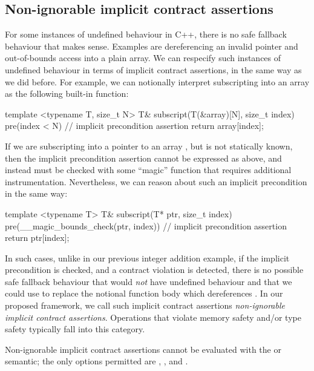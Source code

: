 \subsection{Non-ignorable implicit contract assertions}

For some instances of undefined behaviour in C++, there is no safe fallback behaviour that makes sense. Examples are dereferencing an invalid pointer and out-of-bounds access into a plain array. We can respecify such instances of undefined behaviour in terms of implicit contract assertions, in the same way as we did before. For example, we can notionally interpret subscripting into an array as the following built-in function:
\begin{codeblock}
template <typename T, size_t N>
T& subscript(T(&array)[N], size_t index) 
pre(index < N) {  // implicit precondition assertion
  return array[index];
}
\end{codeblock}
If we are subscripting into a pointer  to an array , but  is not statically known, then the implicit precondition assertion cannot be expressed as above, and instead must be checked with some ``magic'' function that requires additional instrumentation. Nevertheless, we can reason about such an implicit precondition in the same way:
\begin{codeblock}
template <typename T>
T& subscript(T* ptr, size_t index) 
pre(__magic_bounds_check(ptr, index)) {  // implicit precondition assertion
  return ptr[index];
}
\end{codeblock}
In such cases, unlike in our previous integer addition example, if the implicit precondition is checked, and a contract violation is detected, there is no possible safe fallback behaviour that would \emph{not} have undefined behaviour and that we could use to replace the notional function body which dereferences . In our proposed framework, we call such implicit contract assertions \emph{non-ignorable implicit contract assertions}. Operations that violate memory safety and/or type safety typically fall into this category.

Non-ignorable implicit contract assertions cannot be evaluated with the  or  semantic; the only options permitted are , , and .

